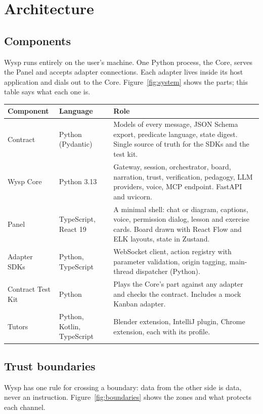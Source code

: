 ﻿\section{Architecture}\label{sec:architecture}

\subsection{Components}

Wysp runs entirely on the user's machine. One Python process, the Core, serves the Panel and accepts adapter connections. Each adapter lives inside its host application and dials out to the Core. Figure~\ref{fig:system} shows the parts; this table says what each one is.

\begin{xltabular}{\textwidth}{@{}L{3.0cm}L{2.5cm}Y@{}}
\toprule
\textbf{Component} & \textbf{Language} & \textbf{Role} \\
\midrule
Contract & Python (Pydantic) & Models of every message, JSON Schema export, predicate language, state digest. Single source of truth for the SDKs and the test kit. \\
Wysp Core & Python 3.13 & Gateway, session, orchestrator, board, narration, trust, verification, pedagogy, LLM providers, voice, MCP endpoint. FastAPI and uvicorn. \\
Panel & TypeScript, React 19 & A minimal shell: chat or diagram, captions, voice, permission dialog, lesson and exercise cards. Board drawn with React Flow and ELK layouts, state in Zustand. \\
Adapter SDKs & Python, TypeScript & WebSocket client, action registry with parameter validation, origin tagging, main-thread dispatcher (Python). \\
Contract Test Kit & Python & Plays the Core's part against any adapter and checks the contract. Includes a mock Kanban adapter. \\
Tutors & Python, Kotlin, TypeScript & Blender extension, IntelliJ plugin, Chrome extension, each with its profile. \\
\bottomrule
\end{xltabular}

\subsection{Trust boundaries}

Wysp has one rule for crossing a boundary: data from the other side is data, never an instruction. Figure~\ref{fig:boundaries} shows the zones and what protects each channel.

